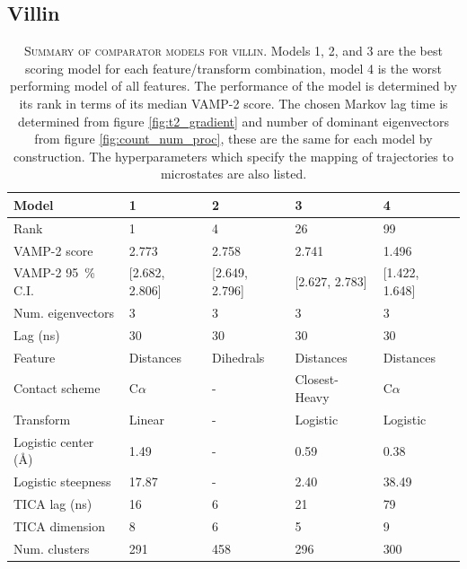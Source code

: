 \documentclass{article}
\begin{document}
\clearpage
\subsection{Villin}

\begin{table}[h]
    \centering
    \begin{tabular}{lllll}
    \toprule
    Model &               1 &               2 &               3 &               4 \\
    \midrule
    Rank                             &               1 &               4 &              26 &              99 \\
    VAMP-2 score                     &           2.773 &           2.758 &           2.741 &           1.496 \\
    VAMP-2 \SI{95}{\percent} C.I.    &  [2.682, 2.806] &  [2.649, 2.796] &  [2.627, 2.783] &  [1.422, 1.648] \\
    Num. eigenvectors                &               3 &               3 &               3 &               3 \\
    Lag (ns)                         &              30 &              30 &              30 &              30 \\
    Feature                          &       Distances &       Dihedrals &       Distances &       Distances \\
    Contact scheme                   &       C$\alpha$ &               - &   Closest-Heavy &       C$\alpha$ \\
    Transform                        &          Linear &               - &        Logistic &        Logistic \\
    Logistic center (\si{\angstrom}) &            1.49 &               - &            0.59 &            0.38 \\
    Logistic steepness               &           17.87 &               - &            2.40 &           38.49 \\
    TICA lag (ns)                    &              16 &               6 &              21 &              79 \\
    TICA dimension                   &               8 &               6 &               5 &               9 \\
    Num. clusters                    &             291 &             458 &             296 &             300 \\
    \bottomrule
    \end{tabular}
    \caption{\textsc{Summary of comparator models for villin.} Models 1, 2, and 3 are the best scoring model for each feature/transform combination, model 4 is the worst performing model of all features.  The performance of the model is determined by its rank in terms of its median VAMP-2 score.  The chosen Markov lag time is determined from figure \ref{fig:t2_gradient} and number of dominant eigenvectors from figure \ref{fig:count_num_proc}, these are the same for each model by construction. The hyperparameters which specify the mapping of trajectories to microstates are also listed.}
    \label{tab:2f4k_mod_defs}
\end{table}
\end{document}

